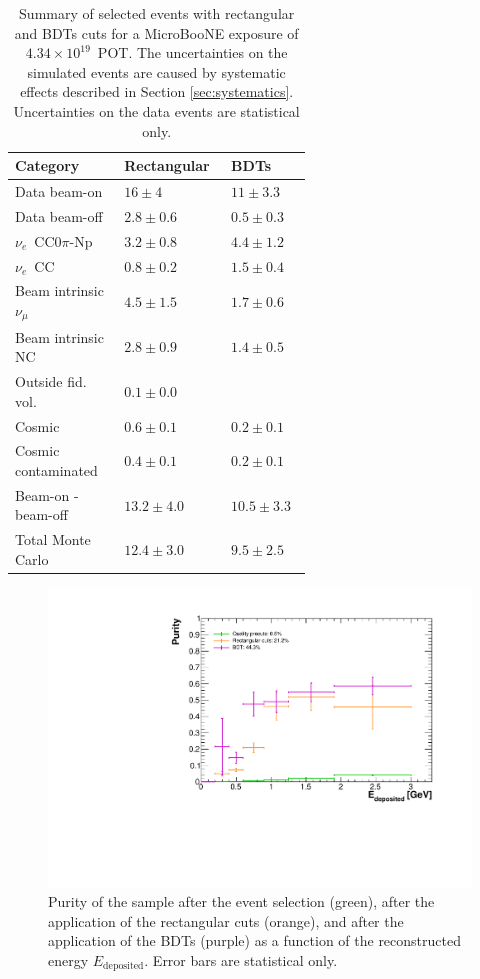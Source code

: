 \begin{table}[htbp]
   \centering
      \caption{Summary of selected events with rectangular and BDTs cuts for a MicroBooNE exposure of $4.34\times10^{19}$~POT. The uncertainties on the simulated events are caused by systematic effects described in Section \ref{sec:systematics}. Uncertainties on the data events are statistical only.}\label{tab:overview}
   \begin{tabular}{
   p{0.27\linewidth}
   >{\raggedleft\arraybackslash}p{0.16\linewidth}
   >{\raggedleft\arraybackslash}p{0.16\linewidth}}
     \toprule
     Category & Rectangular & BDTs \\
     \midrule
     Data beam-on & $16\pm4$ & $11\pm3.3$ \\
     Data beam-off & $2.8\pm0.6$ & $0.5\pm0.3$ \\
     $\nu_e$~CC0$\pi$-Np & $3.2\pm0.8$ & $4.4\pm1.2$\\
     $\nu_e$~CC & $0.8\pm0.2$ & $1.5\pm0.4$ \\
     Beam intrinsic $\nu_{\mu}$ & $4.5\pm1.5$ & $1.7\pm0.6$ \\
     Beam intrinsic NC & $2.8\pm0.9$ & $1.4\pm0.5$ \\
     Outside fid. vol. & $0.1\pm0.0$ & 0 \\
     Cosmic & $0.6\pm0.1$ & $0.2\pm0.1$ \\
     Cosmic contaminated & $0.4\pm0.1$ & $0.2\pm0.1$ \\
     \midrule
     Beam-on - beam-off & $13.2\pm4.0$ & $10.5\pm3.3$ \\
     Total Monte Carlo & $12.4\pm3.0$ & $9.5\pm2.5$ \\
     \bottomrule
   \end{tabular}
\end{table}


\begin{figure}[htbp]
\centering
  \includegraphics[width=0.75\linewidth]{figures/purity_bdt.pdf}
  \caption{Purity of the sample after the event selection (green), after the application of the rectangular cuts (orange), and after the application of the BDTs (purple) as a function of the reconstructed energy $E_{\mathrm{deposited}}$. Error bars are statistical only.}\label{fig:purity_bdt}
\end{figure}

